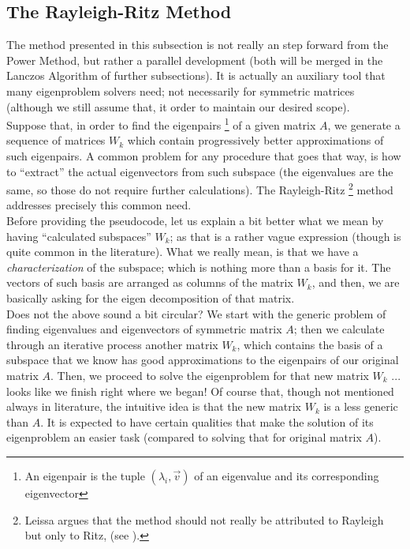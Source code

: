 \subsection{The Rayleigh-Ritz Method}

The method presented in this subsection is not really an
step forward from the Power Method, but rather a parallel development
(both will be merged in the Lanczos Algorithm of further
subsections). It is actually an auxiliary tool that many eigenproblem
solvers need; not necessarily for symmetric matrices (although we
still assume that, it order to maintain our desired scope). \\ 

Suppose that, in order to find the eigenpairs \footnote {An eigenpair
  is the tuple $(\lambda_i,\vec{v})$ of an eigenvalue and its
  corresponding eigenvector} of a given matrix $A$,
we generate a sequence of matrices ${ W_k }$ which contain
progressively better approximations of such eigenpairs. A common
problem for any procedure that goes that way, is how to ``extract''
the actual eigenvectors from such subspace (the eigenvalues are the
same, so those do not require further calculations). The
Rayleigh-Ritz \footnote{Leissa argues that the method should not
  really be attributed to Rayleigh but only to Ritz, (see
  \cite{leissa05}).} method addresses precisely this common need. \\

Before providing the pseudocode, let us explain a bit better what we
mean by having ``calculated subspaces'' $W_k$; as that is a rather
vague expression (though is quite common in the literature). What we
really mean, is that we have a \emph{characterization} of the
subspace; which is nothing more than a basis for it. The vectors of
such basis are arranged as columns of the matrix $W_k$, and then, we
are basically asking for the eigen decomposition of that matrix. \\

Does not the above sound a bit circular? We start with the generic
problem of finding eigenvalues and eigenvectors of symmetric matrix
$A$; then we calculate through an iterative process another matrix
$W_k$, which contains the basis of a subspace that we know has good
approximations to the eigenpairs of our original matrix $A$. Then, we
proceed to solve the eigenproblem for that new matrix $W_k$ ... looks
like we finish right where we began! Of course that, though not
mentioned always in literature, the intuitive idea is that the new
matrix $W_k$ is a less generic than $A$. It is expected to have certain
qualities that make the solution of its eigenproblem an easier task
(compared to solving that for original matrix $A$).  \\

